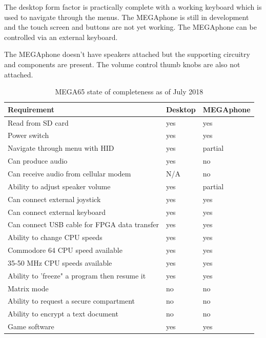 The desktop form factor is practically complete with a working keyboard which is used to navigate through the menus. The MEGAphone is still in development and the touch screen and buttons are not yet working. The MEGAphone can be controlled via an external keyboard.

The MEGAphone doesn't have speakers attached but the supporting circuitry and components are present. The volume control thumb knobs are also not attached. 

\begin{table}[h!]
  \begin{center}
    \caption{MEGA65 state of completeness as of July 2018}
    \label{tab:table1}
    \begin{tabular}{l|l|l} %
      \textbf{Requirement} & \textbf{Desktop} & \textbf{MEGAphone}\\
      \hline
      Read from SD card 									& yes		& yes \\
      Power switch											& yes 		& yes \\
      Navigate through menu with HID						& yes		& partial \\
      Can produce audio										& yes		& no \\
      Can receive audio from cellular modem					& N/A		& no 	\\
      Ability to adjust speaker volume						& yes		& partial \\
      Can connect external joystick							& yes 		& yes \\
      Can connect external keyboard							& yes		& yes \\
      Can connect USB cable for FPGA data transfer			& yes 		& yes \\
      Ability to change CPU speeds							& yes 		& yes \\ 
      Commodore 64 CPU speed available						& yes 		& yes \\
      35-50 MHz CPU speeds available						& yes 		& yes \\
      Ability to 'freeze" a program then resume it			& yes 		& yes \\
      Matrix mode											& no 		& no \\
      Ability to request a secure compartment				& no 		& no \\ 
      Ability to encrypt a text document					& no 		& no \\ 
      Game software											& yes 		& yes \\

\end{tabular}
\end{center}
\end{table}
